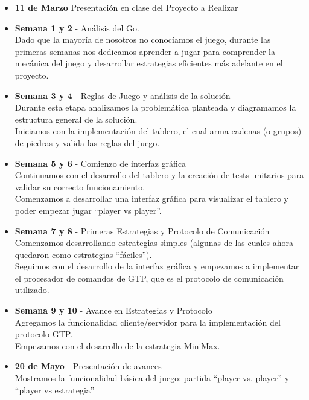 \documentclass[11pt]{article}
\begin{document}
\begin{itemize}
 \item \textbf{11 de Marzo} Presentaci\'on en clase del Proyecto a Realizar
 \item \textbf{Semana 1 y 2} - An\'alisis del Go. \\
	Dado que la mayor\'ia de nosotros no conoc\'iamos el juego, durante las primeras semanas nos dedicamos aprender a jugar para 
	comprender la mec\'anica del juego y desarrollar estrategias eficientes m\'as adelante en el proyecto. 

  \item \textbf{Semana 3 y 4} - Reglas de Juego y an\'alisis de la soluci\'on\\
	Durante esta etapa analizamos la problem\'atica planteada y diagramamos la estructura general de la soluci\'on.\\
	Iniciamos con la implementaci\'on del tablero, el cual arma cadenas (o grupos) de piedras y valida las reglas del juego.

  \item \textbf{Semana 5 y 6} - Comienzo de interfaz gr\'afica\\
        Continuamos con el desarrollo del tablero y la creaci\'on de tests unitarios para validar su correcto funcionamiento.\\
	Comenzamos a desarrollar una interfaz gr\'afica para visualizar el tablero y poder empezar jugar ``player vs player''.

  \item \textbf{Semana 7 y 8} - Primeras Estrategias y Protocolo de Comunicaci\'on\\
	Comenzamos desarrollando estrategias simples (algunas de las cuales ahora quedaron como estrategias ``f\'aciles''). \\
	Seguimos con el desarrollo de la interfaz gr\'afica y empezamos a implementar el procesador de comandos de GTP, que es el protocolo de comunicaci\'on utilizado.

  \item \textbf{Semana 9 y 10} - Avance en Estrategias y Protocolo\\
	Agregamos la funcionalidad cliente/servidor para la implementaci\'on del protocolo GTP. \\
	Empezamos con el desarrollo de la estrategia MiniMax.

  \item \textbf{20 de Mayo} - Presentaci\'on de avances\\
	Mostramos la funcionalidad b\'asica del juego: partida ``player vs. player'' y ``player vs estrategia''
 

\end{itemize}
\end{document}
